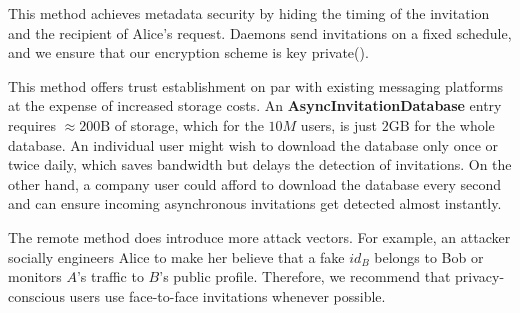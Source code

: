 This method achieves metadata security by hiding the timing of the invitation and the recipient of Alice's request. Daemons send invitations on a fixed schedule, and we ensure that our encryption scheme is key private().

This method offers trust establishment on par with existing messaging platforms at the expense of increased storage costs. An \textbf{AsyncInvitationDatabase} entry requires $\approx200\text{B}$ of storage, which for the $10M$ users, is just $2\text{GB}$ for the whole database. An individual user might wish to download the database only once or twice daily, which saves bandwidth but delays the detection of invitations. On the other hand, a company user could afford to download the database every second and can ensure incoming asynchronous invitations get detected almost instantly.

The remote method does introduce more attack vectors. For example, an attacker socially engineers Alice to make her believe that a fake $id_B$ belongs to Bob or monitors $A$'s traffic to $B$'s public profile. Therefore, we recommend that privacy-conscious users use face-to-face invitations whenever possible.